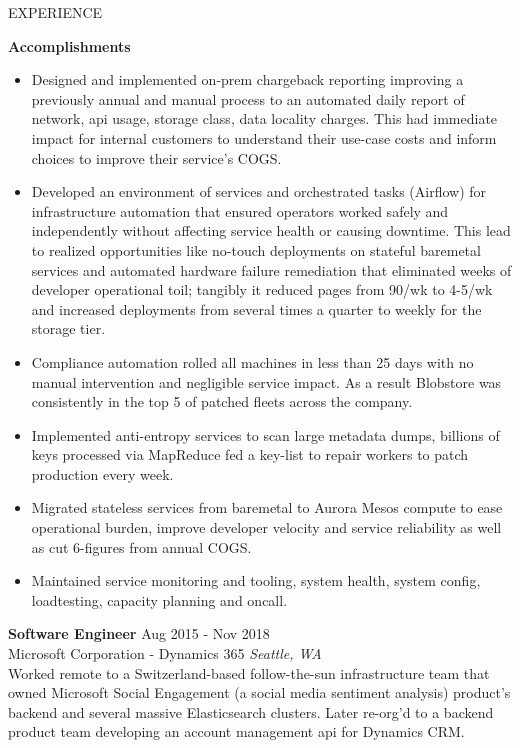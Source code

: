 \begin{rSection}{EXPERIENCE}
\begin{mdframed}[linewidth=2,linecolor=blue, innertopmargin=1em, innerbottommargin=1em, topline=false, rightline=false, bottomline=false]
{\bf Accomplishments}
 \begin{itemize}
    \itemsep -5pt {} 
     \item Designed and implemented on-prem chargeback reporting improving a previously annual and manual process to an automated daily report of network, api usage, storage class, data locality charges. This had immediate impact for internal customers to understand their use-case costs and inform choices to improve their service's COGS.
     \item Developed an environment of services and orchestrated tasks (Airflow) for infrastructure automation that ensured operators worked safely and independently without affecting service health or causing downtime. This lead to realized opportunities like no-touch deployments on stateful baremetal services and automated hardware failure remediation that eliminated weeks of developer operational toil; tangibly it reduced pages from 90/wk to 4-5/wk and increased deployments from several times a quarter to weekly for the storage tier.
     \item Compliance automation rolled all machines in less than 25 days with no manual intervention and negligible service impact. As a result Blobstore was consistently in the top 5 of patched fleets across the company. 
     \item Implemented anti-entropy services to scan large metadata dumps, billions of keys processed via MapReduce fed a key-list to repair workers to patch production every week. 
     \item Migrated stateless services from baremetal to Aurora Mesos compute to ease operational burden, improve developer velocity and service reliability as well as cut 6-figures from annual COGS.
     \item Maintained service monitoring and tooling, system health, system config, loadtesting, capacity planning and oncall.
 \end{itemize}
\end{mdframed}
\begin{mdframed}[linewidth=2,linecolor=green, innertopmargin=1em, innerbottommargin=0em, topline=false, rightline=false, bottomline=false]
\textbf{Software Engineer} \hfill Aug 2015 - Nov 2018\\
Microsoft Corporation - Dynamics 365 \hfill \textit{Seattle, WA} \vspace{1em} \\
Worked remote to a Switzerland-based follow-the-sun infrastructure team that owned Microsoft Social Engagement (a social media sentiment analysis) product's backend and several massive Elasticsearch clusters. Later re-org'd to a backend product team developing an account management api for Dynamics CRM.\vspace{0.5em}
\end{mdframed}
\end{rSection}